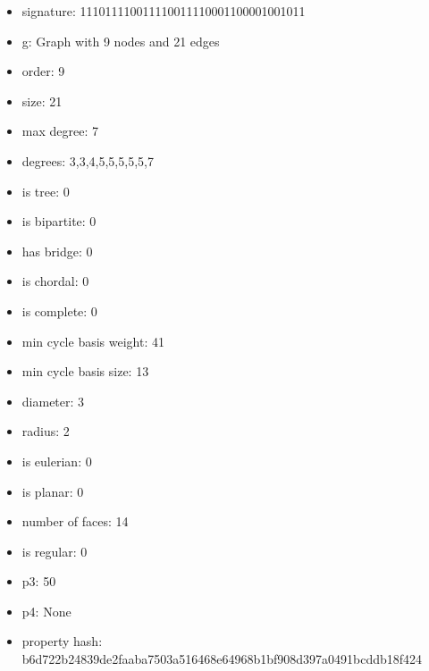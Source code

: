 \newpage
\begin{figure}
\end{figure}
\begin{itemize}
\item signature: 111011110011110011110001100001001011
\item g: Graph with 9 nodes and 21 edges
\item order: 9
\item size: 21
\item max degree: 7
\item degrees: 3,3,4,5,5,5,5,5,7
\item is tree: 0
\item is bipartite: 0
\item has bridge: 0
\item is chordal: 0
\item is complete: 0
\item min cycle basis weight: 41
\item min cycle basis size: 13
\item diameter: 3
\item radius: 2
\item is eulerian: 0
\item is planar: 0
\item number of faces: 14
\item is regular: 0
\item p3: 50
\item p4: None
\item property hash: b6d722b24839de2faaba7503a516468e64968b1bf908d397a0491bcddb18f424
\end{itemize}
